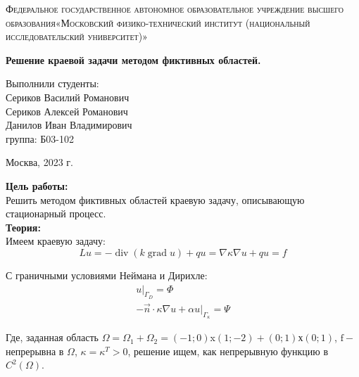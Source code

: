 \documentclass[a4paper, 12pt]{article}%
\begin{document}
	\begin{titlepage}
		\begin{center}
			\textsc{Федеральное государственное автономное образовательное учреждение высшего образования«Московский физико-технический институт (национальный исследовательский университет)»\\[5mm]
			}
			
			\vfill
			
			\textbf{Решение краевой задачи методом фиктивных областей.
				\\[50mm]
			}
			
		\end{center}
		
		\hfill
		\begin{minipage}{.5\textwidth}
			Выполнили студенты:\\[2mm]
			Сериков Василий Романович\\[2mm]
			Сериков Алексей Романович\\[2mm]
			Данилов Иван Владимирович\\[2mm]
			группа: Б03-102\\[5mm]
			
		\end{minipage}
		\vfill
		\begin{center}
			Москва, 2023 г.
		\end{center}
		
	\end{titlepage}
	
	\newpage
	\setcounter{page}{2}
	
	\textbf{Цель работы: }\\
	
	Решить методом фиктивных областей краевую задачу, описывающую стационарный процесс.\\
	
	\textbf{Теория: }\\
	
		Имеем краевую задачу:
	$$
	L u=-\operatorname{div}(k \operatorname{grad} u)+ qu = \nabla \kappa \nabla u + qu=f
	$$
	
	С граничными условиями Неймана и Дирихле:
	$$
	\begin{gathered}
		\left.u\right|_{\Gamma_D}=\Phi \\
		-\vec{n} \cdot \kappa \nabla u+\left.\alpha u\right|_{\Gamma_\kappa}=\Psi
	\end{gathered}
	$$
	
	Где, заданная область $\Omega= \Omega_1 + \Omega_2 = (-1 ; 0)$x$(1 ; -2)+(0 ; 1)$х$(0 ; 1)$, $\mathrm{f}-$ непрерывна в $\Omega$, $\kappa=\kappa^T>0$, решение ищем, как непрерывную функцию в $C^2(\Omega)$.
	
\end{document}
